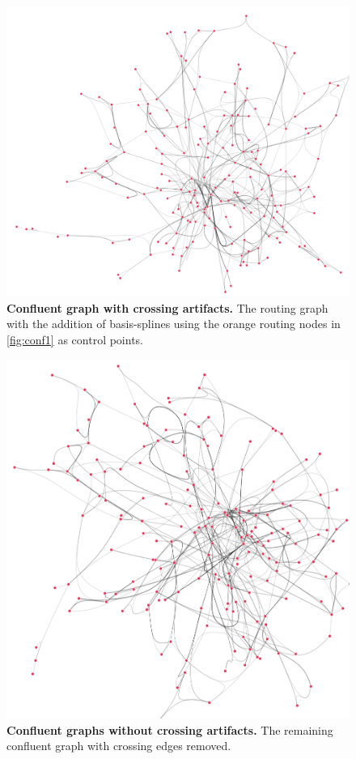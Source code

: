 \begin{figure}[H]
     \centering
     \includegraphics[width=.8\textwidth]{figures_c1/layout/confluent/2.png}
        \caption{\textbf{Confluent graph with crossing artifacts.} The routing graph with the addition of basis-splines using the orange routing nodes in \autoref{fig:conf1} as control points.}
      \label{fig:conf2}
\end{figure}

\begin{figure}[H]
     \centering
     \includegraphics[width=.8\textwidth]{figures_c1/layout/confluent/4.png}
        \caption{\textbf{Confluent graphs without crossing artifacts.} The remaining confluent graph with crossing edges removed. }
      \label{fig:conf4}
\end{figure}



